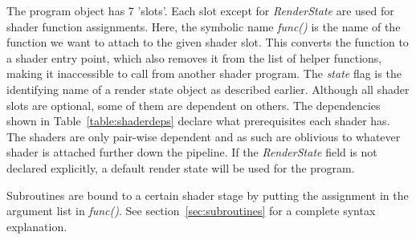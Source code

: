 \documentclass{article}
\begin{document}
The program object has 7 'slots'. Each slot except for \textit{RenderState} are used for shader function assignments. Here, the symbolic name \textit{func()} is the name of the function we want to attach to the given shader slot. This converts the function to a shader entry point, which also removes it from the list of helper functions, making it inaccessible to call from another shader program. The \textit{state} flag is the identifying name of a render state object as described earlier. Although all shader slots are optional, some of them are dependent on others. The dependencies shown in Table~\ref{table:shaderdeps} declare what prerequisites each shader has. The shaders are only pair-wise dependent and as such are oblivious to whatever shader is attached further down the pipeline. If the \textit{RenderState} field is not declared explicitly, a default render state will be used for the program.

Subroutines are bound to a certain shader stage by putting the assignment in the argument list in \textit{func()}. See section~\ref{sec:subroutines} for a complete syntax explanation.

\begin{table}[float]
\caption{Shader dependencies}
\label{table:shaderdeps}
\end{table}
\end{document}

